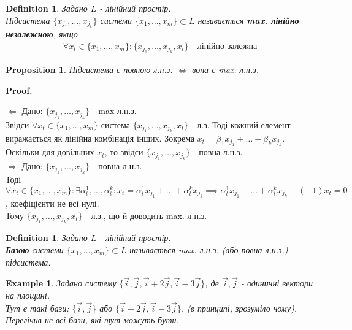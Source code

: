\documentclass[a4paper, 10pt]{article}
\makeatletter
\def\rightproof{$\boxed{\Rightarrow}$ }
\def\leftproof{$\boxed{\Leftarrow}$ }
\theoremstyle{theoremdd}
\newtheorem{definition}[theorem]{Definition}
\newtheorem{example}[theorem]{Example}
\newtheorem{proposition}[theorem]{Proposition}
\renewenvironment{proof}[1][Proof.\\]{\par
\pushQED{\hfill \qed}%
\normalfont \topsep6\p@\@plus6\p@\relax
\trivlist
\item\relax
{\bfseries
#1\@addpunct{.}}\hspace\labelsep\ignorespaces
}{%
\popQED\endtrivlist\@endpefalse
}
\makeatother
\begin{document}
	\begin{definition}
	Задано $L$ - лінійний простір.\\
	Підсистема $\{x_{j_1}, \dots, x_{j_k}\}$ системи $\{x_1, \dots, x_m\} \subset L$ називається \textbf{max. лінійно незалежною}, якщо
	\begin{align*}
	\forall x_t \in \{x_1, \dots, x_m\}: \{x_{j_1}, \dots, x_{j_k}, x_t\} \textrm{ - лінійно залежна}
	\end{align*}
	\end{definition}
	
	\begin{proposition}
	Підсистема є повною л.н.з. $\iff$ вона є max. л.н.з.
	\end{proposition}
	
	\begin{proof}
	\leftproof Дано: $\{x_{j_1}, \dots, x_{j_k}\}$ - max л.н.з.\\
	Звідси $\forall x_t \in \{x_1, \dots, x_m \}$ система $\{x_{j_1}, \dots, x_{j_k}, x_t\}$ - л.з. Тоді кожний елемент виражається як лінійна комбінація інших. Зокрема $x_t = \beta_1 x_{j_1} + \dots + \beta_k x_{j_k}$.\\
	Оскільки для довільних $x_t$, то звідси $\{x_{j_1},\dots, x_{j_k}\}$ - повна л.н.з.
	\bigskip \\
	\rightproof Дано: $\{x_{j_1}, \dots, x_{j_k}\}$ - повна л.н.з.\\
	Тоді $\forall x_t \in \{x_1, \dots, x_m\}: \exists \alpha^1_t, \dots, \alpha^k_t: x_t = \alpha^1_t x_{j_1} + \dots + \alpha^k_t x_{j_k} \implies \alpha^1_t x_{j_1} + \dots + \alpha^k_t x_{j_k} + (-1)x_t = 0$, коефіцієнти не всі нулі.\\
	Тому $\{x_{j_1}, \dots, x_{j_k}, x_t\}$ - л.з., що й доводить max. л.н.з.
	\end{proof}
	
	\begin{definition}
	Задано $L$ - лінійний простір.\\
	\textbf{Базою} системи $\{x_1, \dots, x_m\} \subset L$ називається max. л.н.з. (або повна л.н.з.) підсистема.
	\end{definition}
	
	\begin{example}
	Задано систему $\{\vec{i}, \vec{j}, \vec{i}+2\vec{j}, \vec{i}-3\vec{j} \}$, де $\vec{i},\vec{j}$ - одиничні вектори на площині.\\
	Тут є такі бази: $\{\vec{i},\vec{j}\}$ або $\{\vec{i}+2\vec{j},\vec{i}-3\vec{j}\}$. (в принципі, зрозуміло чому). Перелічив не всі бази, які тут можуть бути.
	\end{example}
	
\end{document}
